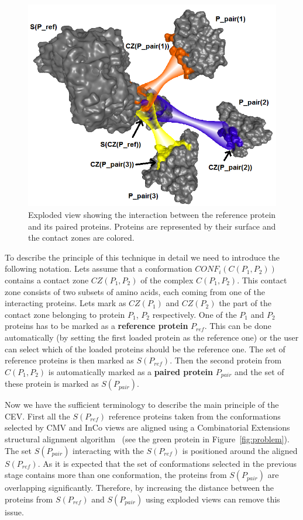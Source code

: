 \documentclass[journal]{vgtc}                %
\begin{document}
\begin{figure}[bt]
  \centering
  \includegraphics[width=1.0\columnwidth]{exploded.png}
  \caption{Exploded view showing the interaction between the reference protein and its paired proteins. Proteins are represented by their surface and the contact zones are colored.}
  \label{fig:exploded}
\end{figure}

To describe the principle of this technique in detail we need to introduce the following notation.
Lets assume that a conformation $CONF_i(C(P_1,P_2))$ contains a contact zone $CZ(P_1,P_2)$ of the complex $C(P_1,P_2)$.
This contact zone consists of two subsets of amino acids, each coming from one of the interacting proteins.
Lets mark as $CZ(P_1)$ and $CZ(P_2)$ the part of the contact zone belonging to protein $P_1$, $P_2$ respectively.
One of the $P_1$ and $P_2$ proteins has to be marked as a \textbf{reference protein} $P_{ref}$.
This can be done automatically (by setting the first loaded protein as the reference one) or the user can select which of the loaded proteins should be the reference one.
The set of reference proteins is then marked as $S(P_{ref})$.
Then the second protein from $C(P_1,P_2)$ is automatically marked as a \textbf{paired protein} $P_{pair}$ and the set of these protein is marked as $S(P_{pair})$.

Now we have the sufficient terminology to describe the main principle of the CEV.
First all the $S(P_{ref})$ reference proteins taken from the conformations selected by CMV and InCo views are aligned using a Combinatorial Extensions structural alignment algorithm~\cite{Shindyalov1998} (see the green protein in Figure~\ref{fig:problem}).
The set $S(P_{pair})$ interacting with the $S(P_{ref})$ is positioned around the aligned $S(P_{ref})$.
As it is expected that the set of conformations selected in the previous stage contains more than one conformation, the proteins from $S(P_{pair})$ are overlapping significantly.
Therefore, by increasing the distance between the proteins from $S(P_{ref})$ and $S(P_{pair})$ using exploded views can remove this issue.
\end{document}
